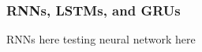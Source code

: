 \begin{frame}
	\frametitle{RNNs, LSTMs, and GRUs}

RNNs here
testing neural network here 

\end{frame}